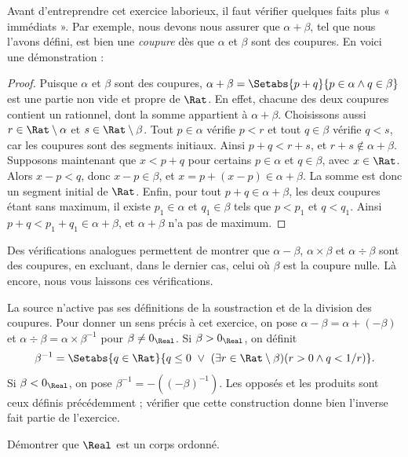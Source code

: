 \documentclass[11pt,a4paper,openany]{memoir}
\begin{document}
Avant d'entreprendre cet exercice laborieux, il faut vérifier quelques
faits plus « immédiats ». Par exemple, nous devons nous assurer que
$\alpha + \beta$, tel que nous l'avons défini, est bien une
\emph{coupure} dès que $\alpha$ et $\beta$ sont des coupures.
En voici une démonstration :

\begin{proof}
Puisque $\alpha$ et $\beta$ sont des coupures,
$\alpha + \beta = \Setabs{p + q}{p \in \alpha \land q \in \beta}$
est une partie non vide et propre de $\Rat$. En effet, chacune des
deux coupures contient un rationnel, dont la somme appartient à
$\alpha+\beta$. Choisissons aussi $r\in\Rat\setminus\alpha$ et
$s\in\Rat\setminus\beta$. Tout $p\in\alpha$ vérifie $p<r$ et tout
$q\in\beta$ vérifie $q<s$, car les coupures sont des segments initiaux.
Ainsi $p+q<r+s$, et $r+s\notin\alpha+\beta$.
Supposons maintenant que $x < p + q$ pour certains $p \in \alpha$ et
$q \in \beta$, avec $x\in\Rat$. Alors $x - p < q$, donc
$x - p \in \beta$, et $x = p + (x - p) \in \alpha + \beta$.
La somme est donc un segment initial de $\Rat$.
Enfin, pour tout $p + q \in \alpha + \beta$, les deux coupures étant
sans maximum, il existe $p_1 \in \alpha$ et $q_1 \in \beta$ tels que
$p < p_1$ et $q < q_1$. Ainsi
$p + q < p_1 + q_1 \in \alpha + \beta$, et $\alpha+\beta$ n'a pas de maximum.
\end{proof}

Des vérifications analogues permettent de montrer que $\alpha - \beta$,
$\alpha \times \beta$ et $\alpha \div \beta$ sont des coupures, en
excluant, dans le dernier cas, celui où $\beta$ est la coupure nulle.
Là encore, nous vous laissons ces vérifications.
\begin{editorial}
La source n'active pas ses définitions de la soustraction et de la
division des coupures. Pour donner un sens précis à cet exercice,
on pose $\alpha-\beta=\alpha+(-\beta)$ et
$\alpha\div\beta=\alpha\times\beta^{-1}$ pour $\beta\neq0_\Real$.
Si $\beta>0_\Real$, on définit
\[
\beta^{-1}=\Setabs{q\in\Rat}{q\leq0\ \lor\
(\exists r\in\Rat\setminus\beta)(r>0\land q<1/r)}.
\]
Si $\beta<0_\Real$, on pose $\beta^{-1}=-((-\beta)^{-1})$.
Les opposés et les produits sont ceux définis précédemment ; vérifier
que cette construction donne bien l'inverse fait partie de l'exercice.
\end{editorial}

\begin{prob}
Démontrer que $\Real$ est un corps ordonné.
\end{prob}
\end{document}
